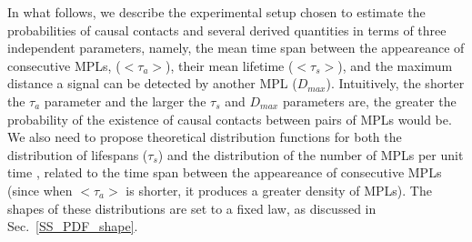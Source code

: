 In what follows, we describe the experimental setup chosen to estimate
the probabilities of causal contacts and several derived quantities in
terms of three independent parameters, namely, the mean time span
between the appeareance of consecutive MPLs, ($<\tau_a>$), their mean
lifetime ($<\tau_s>$), and the maximum distance a signal can be
detected by another MPL ($D_{max}$).
%
Intuitively, the shorter the $\tau_a$ parameter and the larger the
$\tau_s$ and $D_{max}$ parameters are, the greater the probability of
the existence of causal contacts between pairs of MPLs would be.
%
We also need to propose theoretical distribution functions for both
the distribution of lifespans ($\tau_s$) and the distribution of the
number of MPLs per unit time \citep{maccone_evolution_2014,
Sotos_biotechnology_2019}, related to the time span between the
appeareance of consecutive MPLs (since when $<\tau_a>$ is shorter, it
produces a greater density of MPLs).
%
The shapes of these distributions are set to a fixed law, as discussed
in Sec.~\ref{SS_PDF_shape}.


